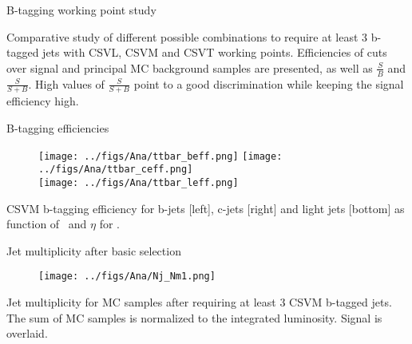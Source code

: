 \begin{frame}{B-tagging working point study}
\vspace{-.2cm}
    \begin{block}{}
      \tiny \centering Comparative study of different possible combinations to require at least 3 b-tagged jets with CSVL, CSVM and CSVT working points. Efficiencies of cuts over signal and principal MC background samples are presented, as well as $\frac{S}{B}$ and $\frac{S}{S+B}$. High values of $\frac{S}{S+B}$ point to a good discrimination while keeping the signal efficiency high.
    \end{block}

\end{frame}

\begin{frame}{B-tagging efficiencies}
\vspace{-.2cm}
\begin{figure}[!Hhtbp]
  \begin{center}
    \texttt{[image: ../figs/Ana/ttbar\_beff.png]}
    \texttt{[image: ../figs/Ana/ttbar\_ceff.png]}\\
    \texttt{[image: ../figs/Ana/ttbar\_leff.png]}
  \end{center}
\end{figure}

\vspace{-.5cm}
    \begin{block}{}
      \tiny \centering CSVM b-tagging efficiency for b-jets [left], c-jets [right] and light jets [bottom] as function of \pt~and $\eta$ for \ttbar.
    \end{block}

\end{frame}

\begin{frame}{Jet multiplicity after basic selection}
\vspace{-.2cm}
\begin{figure}[!Hhtbp]
  \begin{center}
    \texttt{[image: ../figs/Ana/Nj\_Nm1.png]}
  \end{center}
\end{figure}

\vspace{-.2cm}
    \begin{block}{}
      \tiny \centering Jet multiplicity for MC samples after requiring at least 3 CSVM b-tagged jets. The sum of MC samples is normalized to the integrated luminosity. Signal is overlaid.
    \end{block}

\end{frame}

